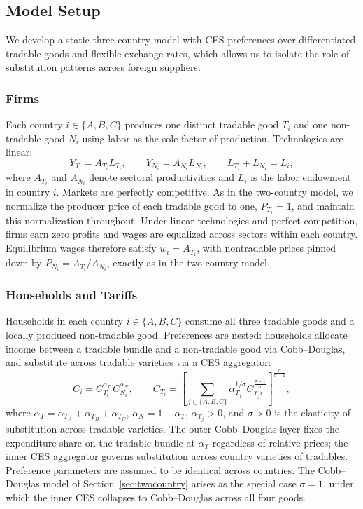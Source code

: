 \documentclass[11pt]{article}
\theoremstyle{plain}
\theoremstyle{remark}
\numberwithin{lemma}{section}
\numberwithin{proposition}{section}
\numberwithin{corollary}{section}
\begin{document}
\subsection{Model Setup}

We develop a static three-country model with CES preferences over differentiated tradable goods and flexible exchange rates, which allows us to isolate the role of substitution patterns across foreign suppliers.

\subsubsection{Firms}

Each country $i \in \{A,B,C\}$ produces one distinct tradable good $T_i$ and one non-tradable good $N_i$ using labor as the sole factor of production. Technologies are linear:
\begin{equation}
Y_{T_i} = A_{T_i} L_{T_i}, \qquad Y_{N_i} = A_{N_i} L_{N_i}, \qquad L_{T_i} + L_{N_i} = L_i,
\end{equation}
where $A_{T_i}$ and $A_{N_i}$ denote sectoral productivities and $L_i$ is the labor endowment in country $i$. Markets are perfectly competitive. As in the two-country model, we normalize the producer price of each tradable good to one, $P_{T_i} = 1$, and maintain this normalization throughout. Under linear technologies and perfect competition, firms earn zero profits and wages are equalized across sectors within each country. Equilibrium wages therefore satisfy $w_i = A_{T_i}$, with nontradable prices pinned down by $P_{N_i} = A_{T_i}/A_{N_i}$, exactly as in the two-country model.

\subsubsection{Households and Tariffs}

Households in each country $i \in \{A,B,C\}$ consume all three tradable goods and a locally produced non-tradable good. Preferences are nested: households allocate income between a tradable bundle and a non-tradable good via Cobb--Douglas, and substitute across tradable varieties via a CES aggregator:
\[
C_i = C_{T_i}^{\alpha_T}\, C_{N_i}^{\alpha_N}, \qquad C_{T_i} = \left[ \sum_{j \in \{A,B,C\}} \alpha_{T_j}^{1/\sigma} C_{T_j i}^{\frac{\sigma-1}{\sigma}} \right]^{\frac{\sigma}{\sigma-1}},
\]
where $\alpha_T = \alpha_{T_A} + \alpha_{T_B} + \alpha_{T_C}$, $\alpha_N = 1 - \alpha_T$, $\alpha_{T_j} > 0$, and $\sigma > 0$ is the elasticity of substitution across tradable varieties. The outer Cobb--Douglas layer fixes the expenditure share on the tradable bundle at $\alpha_T$ regardless of relative prices; the inner CES aggregator governs substitution across country varieties of tradables. Preference parameters are assumed to be identical across countries. The Cobb--Douglas model of Section~\ref{sec:twocountry} arises as the special case $\sigma = 1$, under which the inner CES collapses to Cobb--Douglas across all four goods.
\end{document}
